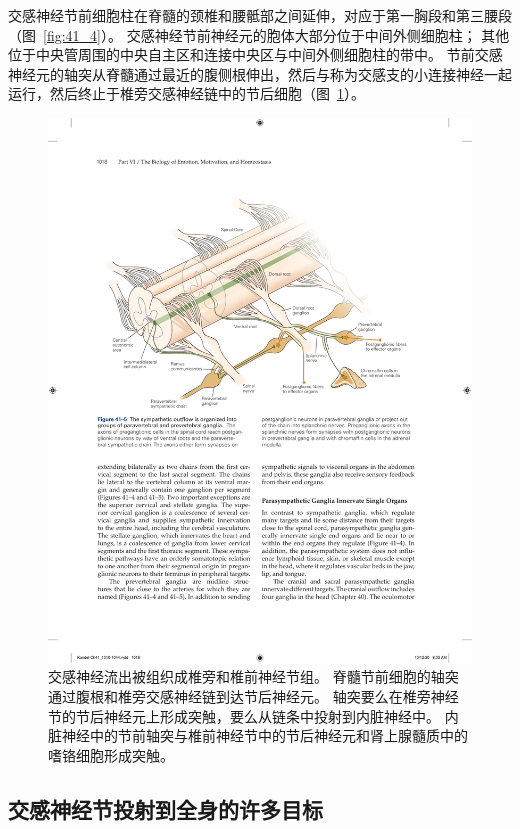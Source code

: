 交感神经节前细胞柱在脊髓的颈椎和腰骶部之间延伸，对应于第一胸段和第三腰段（图~\ref{fig:41_4}）。
交感神经节前神经元的胞体大部分位于中间外侧细胞柱；
其他位于中央管周围的中央自主区和连接中央区与中间外侧细胞柱的带中。
节前交感神经元的轴突从脊髓通过最近的腹侧根伸出，然后与称为交感支的小连接神经一起运行，然后终止于椎旁交感神经链中的节后细胞（图~\ref{fig:41_5}）。


\begin{figure}[htbp]
	\centering
	\includegraphics[width=1.0\linewidth]{chap41/fig_41_5}
	\caption{交感神经流出被组织成椎旁和椎前神经节组。
		脊髓节前细胞的轴突通过腹根和椎旁交感神经链到达节后神经元。
		轴突要么在椎旁神经节的节后神经元上形成突触，要么从链条中投射到内脏神经中。
		内脏神经中的节前轴突与椎前神经节中的节后神经元和肾上腺髓质中的嗜铬细胞形成突触。}
	\label{fig:41_5}
\end{figure}


\subsection{交感神经节投射到全身的许多目标}

